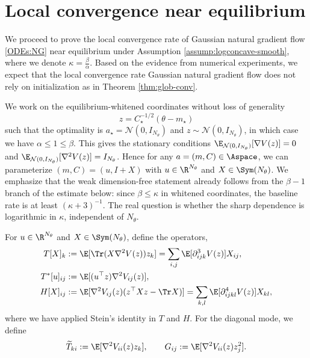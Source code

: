 

\section{Local convergence near equilibrium}
We proceed to prove the local convergence rate of Gaussian natural gradient flow \eqref{ODEs:NG} near equilibrium under Assumption \ref{assump:logconcave-smooth}, where we denote $\kappa = \frac{\beta}{\alpha}$. Based on the evidence from numerical experiments, we expect that the local convergence rate Gaussian natural gradient flow does not rely on initialization as in Theorem \ref{thm:glob-conv}.

We work on the equilibrium-whitened coordinates without loss of generality
\begin{equation}\label{eq:whitened}
    z = C_\star^{-1/2} (\theta - m_\star)
\end{equation}
such that the optimality is $a_\star = \mathcal{N} (0, I_{N_\theta})$ and $z \sim \mathcal{N} (0, I_{N_\theta})$, in which case we have $\alpha \leq 1 \leq \beta$.
This gives the stationary conditions $\E_{\mathcal{N} (0, I_{N_\theta})} [\nabla V(z)] = 0$ and $\E_{\mathcal{N} (0, I_{N_\theta})} [\nabla^2 V(z)] = I_{N_\theta}$. Hence for any $a = (m, C) \in \Aspace$, we can parameterize $(m, C) = (u, I + X)$ with $u \in \R^{N_\theta}$ and $X \in \Sym (N_\theta)$.
We emphasize that the weak dimension-free statement already follows from the $\beta-1$ branch of the estimate below: since $\beta \leq \kappa$ in whitened coordinates, the baseline rate is at least $(\kappa+3)^{-1}$. The real question is whether the sharp dependence is logarithmic in $\kappa$, independent of $N_\theta$.

\begin{definition}\label{def:local-operators}
    For $u \in \R^{N_\theta}$ and $X \in \Sym (N_\theta)$, define the operators,
    \begin{align*}
        T [X]_k &:= \E[\Tr (X \nabla^2 V(z)) z_k] = \sum_{i, j} \E[\partial^3_{ijk} V(z)] X_{ij}, \\
        T^* [u]_{ij} &:= \E[(u^\top z) \nabla^2 V_{ij} (z)], \\
        H [X]_{ij} &:= \E[\nabla^2 V_{ij} (z) (z^\top Xz - \Tr X)] = \sum_{k, l} \E[\partial^4_{ijkl} V(z)] X_{kl},
    \end{align*}
    where we have applied Stein's identity in $T$ and $H$. For the diagonal mode, we define
    \begin{equation*}
        \widetilde{T}_{ki} := \E[\nabla^2 V_{ii} (z) z_k], \qquad G_{ij} := \E[\nabla^2 V_{ii} (z) z_j^2].
    \end{equation*}
\end{definition}

